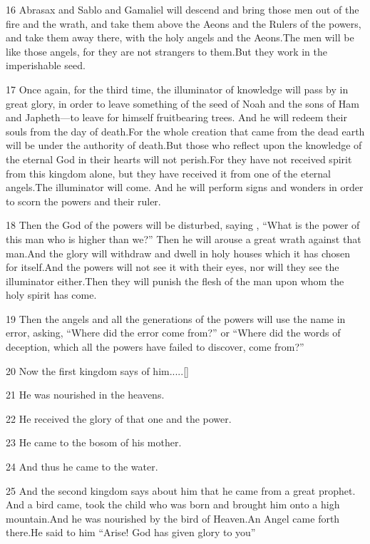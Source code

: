 \par 16 Abrasax and Sablo and Gamaliel will descend and bring those men out of the fire and the wrath, and take them above the Aeons and the Rulers of the powers, and take them away there, with the holy angels and the Aeons.The men will be like those angels, for they are not strangers to them.But they work in the imperishable seed.

\par 17 Once again, for the third time, the illuminator of knowledge will pass by in great glory, in order to leave something of the seed of Noah and the sons of Ham and Japheth—to leave for himself fruitbearing trees. And he will redeem their souls from the day of death.For the whole creation that came from the dead earth will be under the authority of death.But those who reflect upon the knowledge of the eternal God in their hearts will not perish.For they have not received spirit from this kingdom alone, but they have received it from one of the eternal angels.The illuminator will come. And he will perform signs and wonders in order to scorn the powers and their ruler.

\par 18 Then the God of the powers will be disturbed, saying , “What is the power of this man who is higher than we?” Then he will arouse a great wrath against that man.And the glory will withdraw and dwell in holy houses which it has chosen for itself.And the powers will not see it with their eyes, nor will they see the illuminator either.Then they will punish the flesh of the man upon whom the holy spirit has come.

\par 19 Then the angels and all the generations of the powers will use the name in error, asking, “Where did the error come from?” or “Where did the words of deception, which all the powers have failed to discover, come from?”

\par 20 Now the first kingdom says of him.....[]
\par 21 He was nourished in the heavens.
\par 22 He received the glory of that one and the power.
\par 23 He came to the bosom of his mother.
\par 24 And thus he came to the water.
\par 25 And the second kingdom says about him that he came from a great prophet. And a bird came, took the child who was born and brought him onto a high mountain.And he was nourished by the bird of Heaven.An Angel came forth there.He said to him “Arise! God has given glory to you”

